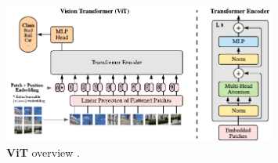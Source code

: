 \begin{figure}[t]
    \centering
    \includegraphics[width=0.8\textwidth]{fig/rel/images/vit_schema.pdf}
    \caption{\textbf{ViT} overview \autocite{dosovitskiy2020image}.}
    \label{fig:rel_vit}
\end{figure}
